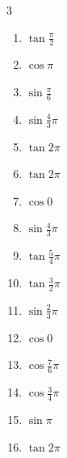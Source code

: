 \begin{multicols}{3}
\begin{enumerate}
  \item $\displaystyle \tan{\frac{\pi}{2}}$
        \phantom{$\displaystyle \quad なし$}

  \item $\displaystyle \cos{\pi}$
        \phantom{$\displaystyle =-1$}

  \item $\displaystyle \sin{\frac{\pi}{6}}$

  \item $\displaystyle \sin{\frac{4}{3}\pi}$

  \item $\displaystyle \tan{2\pi}$
        \phantom{$\displaystyle =0$}

  \item $\displaystyle \tan{2\pi}$
        \phantom{$\displaystyle =0$}

  \item $\displaystyle \cos{0}$
        \phantom{$\displaystyle =1$}

  \item $\displaystyle \sin{\frac{4}{3}\pi}$

  \item $\displaystyle \tan{\frac{5}{4}\pi}$
        \phantom{$\displaystyle =1$}

  \item $\displaystyle \tan{\frac{3}{2}\pi}$
        \phantom{$\displaystyle \quad なし$}

  \item $\displaystyle \sin{\frac{2}{3}\pi}$

\columnbreak %

  \item $\displaystyle \cos{0}$
        \phantom{$\displaystyle =1$}

  \item $\displaystyle \cos{\frac{7}{6}\pi}$

  \item $\displaystyle \cos{\frac{3}{4}\pi}$

  \item $\displaystyle \sin{\pi}$
        \phantom{$\displaystyle =0$}

  \item $\displaystyle \tan{2\pi}$
        \phantom{$\displaystyle =0$}


\end{enumerate}
\end{multicols}
